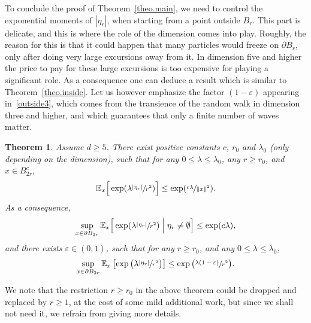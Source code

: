 \documentclass[11pt]{article}
\numberwithin{equation}{section}
\theoremstyle{plain}
\newtheorem{theorem}{Theorem}[section]
\theoremstyle{definition}
\newcommand{\1}{{\text{\Large $\mathfrak 1$}}}
\begin{document}
To conclude the proof of Theorem~\ref{theo.main},
we need to control the exponential moments of $|\eta_r|$,
when starting from a point outside $B_r$.
This part is delicate, and this is where the role of the dimension
comes into play. Roughly, the reason for this is that
it could happen that many particles would freeze
on $\partial B_r$, only after doing very large excursions away from it.
In dimension five and higher the price to pay for
these large excursions is too expensive for playing a significant role.
As a consequence one can deduce
a result which is similar to Theorem~\ref{theo.inside}.
Let us however emphasize the factor $(1-\varepsilon)$
appearing in~\eqref{outside3}, which
comes from the transience of the random walk in
dimension three and higher,
and which guarantees that only a finite number of waves matter.

\begin{theorem}\label{theo.outside5}
Assume $d\ge 5$.
There exist positive constants $c$, $r_0$ and $\lambda_0$ (only depending on the dimension), such that for any $0\le \lambda\le \lambda_0$, any $r\ge r_0$,
and $x\in B_{2r}^c$,
\begin{equation}\label{outside1}
\mathbb E_x\Big[\exp(\lambda \sfrac{|\eta_r|}{r^2})\Big] \le \exp(\sfrac{c\lambda}{\|x\|^2}).
\end{equation}
As a consequence,
\begin{equation}\label{outside2}
\sup_{x\in \partial B_{2r}} \mathbb E_x\Big[\exp(\lambda \sfrac{|\eta_r|}{r^2})
\Bigm|\eta_r\neq \emptyset \Big] \le \exp(c\lambda),
\end{equation}
and there exists $\varepsilon\in (0,1)$, such that for any $r\ge r_0$, and any $0\le \lambda\le \lambda_0$,
\begin{equation}\label{outside3}
\sup_{x\in \partial B_{2r}} \mathbb E_x\left[\exp\big(\lambda \sfrac{
|\eta_r|}{r^2}\big)\right] \le \exp\big(\sfrac{\lambda (1-\varepsilon)}{r^2}\big).
\end{equation}
\end{theorem}
We note that the restriction $r\ge r_0$ in the above theorem could be dropped and replaced by $r\ge 1$, at the cost of some mild additional work, but since we shall not need it, we refrain from giving more details.
\end{document}
